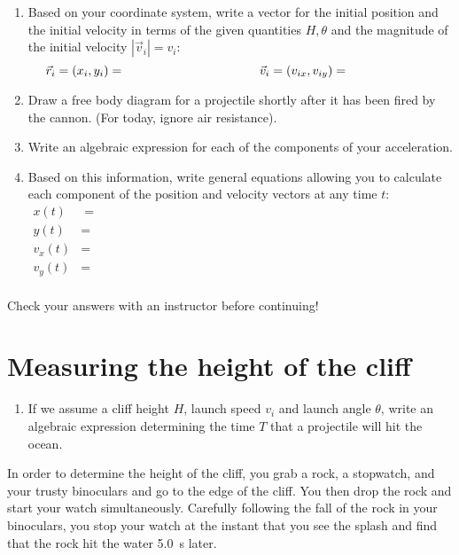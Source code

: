 \documentclass{article}   	%
\begin{document}
\begin{enumerate}[resume]
  \item Based on your coordinate system, write a vector for the initial position and the
  initial velocity in terms of the given quantities $H,\theta$ and the magnitude of the initial
  velocity $\left|\vec{v}_i\right| = v_i$:
  \[
    \vec{r}_i = (x_i, y_i) = \hspace{1.5in} \vec{v}_i = \left(v_{ix},v_{iy}\right) = \hspace{1in}
  \]
  \item Draw a free body diagram for a projectile shortly after it has been fired by the
  cannon. (For today, ignore air resistance). \vspace{0.5in}
  \item Write an algebraic expression for each of the components of your
  acceleration. \vspace{0.5in}
  \item Based on this information, write general equations allowing you to calculate each
  component of the position and velocity vectors at any time $t$:
  \begin{align*}
    x(t) &= \phantom{X} \hspace{5in} \phantom{X} \\
    y(t) &= \\
    v_x(t) &= \\
    v_y(t) &= \\
  \end{align*}
\end{enumerate}

\vfill
{\Large {} Check your answers with an instructor before continuing!}

\newpage
\section{Measuring the height of the cliff}
\begin{enumerate}
  \item If we assume a cliff height $H$, launch speed $v_i$ and launch angle $\theta$, write an
  algebraic expression determining the time $T$ that a projectile will hit the
  ocean. \vspace{0.5in}
\end{enumerate}
\begin{tcolorbox}[colback=black!5!white,colframe=white!15!black,title=More information]
  In order to determine the height of the cliff, you grab a rock, a stopwatch, and your trusty
  binoculars and go to the edge of the cliff. You then drop the rock and start your watch
  simultaneously. Carefully following the fall of the rock in your binoculars, you stop your
  watch at the instant that you see the splash and find that the rock hit the water
  \SI{5.0}{\second} later. 
\end{tcolorbox}
\end{document}
